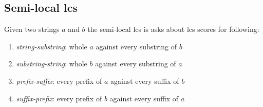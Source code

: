 \subsection{Semi-local lcs}

Given two strings $a$ and $b$ the semi-local lcs is asks about
lcs scores for following:
\begin{enumerate}
\item \emph{string-substring}: whole $a$ against every substring of $b$
\item \emph{substring-string}: whole $b$ against every substring of $a$
\item \emph{prefix-suffix}: every prefix of $a$ against every suffix of $b$
\item \emph{suffix-prefix}: every prefix of $b$ against every suffix of $a$
\end{enumerate} 


